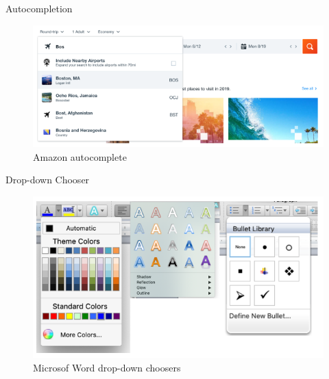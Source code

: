 \documentclass{beamer}
\begin{document}
\begin{frame}[t]{Autocompletion}
	\begin{figure}[h]
		\centering
		\includegraphics[scale=0.6]{images/lec08-pic55.png}
		\caption{Amazon autocomplete}
	\end{figure}
\end{frame}

\begin{frame}[t]{Drop-down Chooser}
	\begin{figure}[h]
		\centering
		\includegraphics[scale=0.6]{images/lec08-pic56.png}
		\caption{Microsof Word drop-down choosers}
	\end{figure}
\end{frame}
\end{document}
